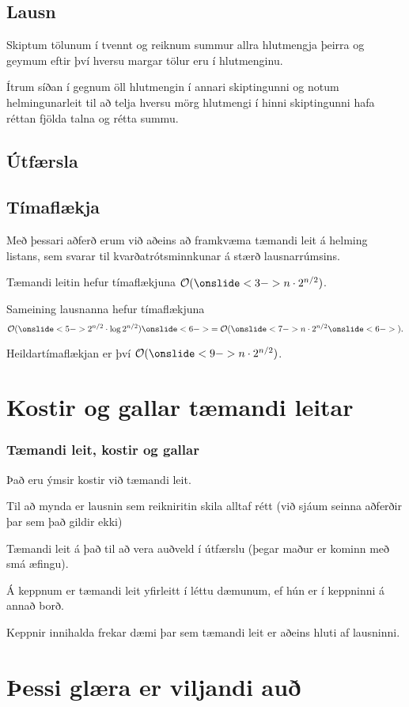 \subsection{Lausn}
{
    {
        \item<1-> Skiptum tölunum í tvennt og reiknum summur allra hlutmengja þeirra og geymum eftir því hversu margar tölur eru í hlutmenginu.
        \item<2-> Ítrum síðan í gegnum öll hlutmengin í annari skiptingunni
            og notum helmingunarleit til að telja hversu mörg hlutmengi í hinni skiptingunni hafa réttan fjölda talna og rétta summu.
    }
}

\subsection{Útfærsla}
{
}

\subsection{Tímaflækja}
{
    {
        \item<1-> Með þessari aðferð erum við aðeins að framkvæma tæmandi leit á helming listans,
            sem svarar til kvarðatrótsminnkunar á stærð lausnarrúmsins.
        \item<2-> Tæmandi leitin hefur tímaflækjuna $\mathcal{O}(\onslide<3->{n \cdot 2^{n/2}})$.
        \item<4-> Sameining lausnanna hefur tímaflækjuna
                    \[
                        \mathcal{O}(
                        \onslide<5->{2^{n/2} \cdot \log 2^{n/2}}
                        )
                        \onslide<6->{ = \mathcal{O}(}
                        \onslide<7->{n \cdot 2^{n/2}}
                        \onslide<6->{).}
                    \]
        \item<8-> Heildartímaflækjan er því $\mathcal{O}(\onslide<9->{n \cdot 2^{n/2}})$.
    }
}

\section{Kostir og gallar tæmandi leitar}
{
    \frametitle{Tæmandi leit, kostir og gallar}
    {
        \item<1-> Það eru ýmsir kostir við tæmandi leit.
        \item<2-> Til að mynda er lausnin sem reikniritin skila alltaf rétt (við sjáum seinna aðferðir þar sem það gildir ekki)
        \item<3-> Tæmandi leit á það til að vera auðveld í útfærslu (þegar maður er kominn með smá æfingu).
        \item<4-> Á keppnum er tæmandi leit yfirleitt í léttu dæmunum, ef hún er í keppninni á annað borð.
        \item<5-> Keppnir innihalda frekar dæmi þar sem tæmandi leit er aðeins hluti af lausninni.
    }
}

\section{Þessi glæra er viljandi auð}
{
}


